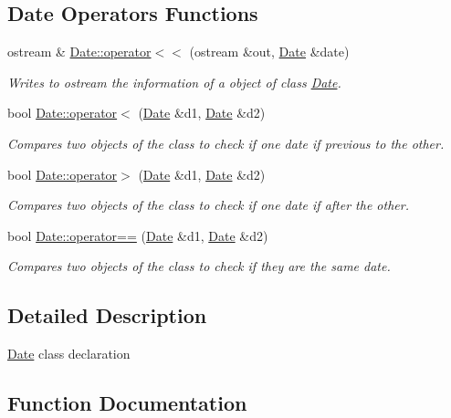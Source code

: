 \subsection*{Date Operators Functions}
\begin{DoxyCompactItemize}
\item 
ostream \& \hyperlink{group___date_ga277b4ff7a5bea855f71b2b7f941fbc2f}{Date\+::operator$<$$<$} (ostream \&out, \hyperlink{class_date}{Date} \&date)
\begin{DoxyCompactList}\small\item\em Writes to ostream the information of a object of class \hyperlink{class_date}{Date}. \end{DoxyCompactList}\item 
bool \hyperlink{group___date_ga532ae38442ee586783b532725767634a}{Date\+::operator$<$} (\hyperlink{class_date}{Date} \&d1, \hyperlink{class_date}{Date} \&d2)
\begin{DoxyCompactList}\small\item\em Compares two objects of the class to check if one date if previous to the other. \end{DoxyCompactList}\item 
bool \hyperlink{group___date_ga3d72003c210f3adc692715148aa7cf26}{Date\+::operator$>$} (\hyperlink{class_date}{Date} \&d1, \hyperlink{class_date}{Date} \&d2)
\begin{DoxyCompactList}\small\item\em Compares two objects of the class to check if one date if after the other. \end{DoxyCompactList}\item 
bool \hyperlink{group___date_gaa932959bdd56052bc683d29b8748898f}{Date\+::operator==} (\hyperlink{class_date}{Date} \&d1, \hyperlink{class_date}{Date} \&d2)
\begin{DoxyCompactList}\small\item\em Compares two objects of the class to check if they are the same date. \end{DoxyCompactList}\end{DoxyCompactItemize}


\subsection{Detailed Description}
\hyperlink{class_date}{Date} class declaration 

\subsection{Function Documentation}
\mbox{\label{group___date_ga5532efafed41fd5f8e013a61313200dc}} 

